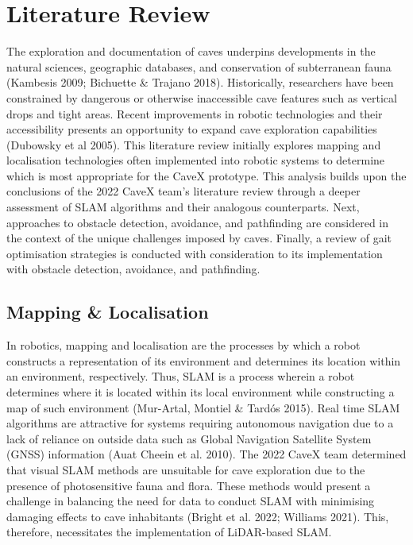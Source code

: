 \section{Literature Review} 
\label{sec:litreview}
The exploration and documentation of caves underpins developments in the natural sciences, geographic databases, and conservation of subterranean fauna (Kambesis 2009; Bichuette \& Trajano 2018). Historically, researchers have been constrained by dangerous or otherwise inaccessible cave features such as vertical drops and tight areas. Recent improvements in robotic technologies and their accessibility presents an opportunity to expand cave exploration capabilities (Dubowsky et al 2005). This literature review initially explores mapping and localisation technologies often implemented into robotic systems to determine which is most appropriate for the CaveX prototype. This analysis builds upon the conclusions of the 2022 CaveX team's literature review through a deeper assessment of SLAM algorithms and their analogous counterparts. Next, approaches to obstacle detection, avoidance, and pathfinding are considered in the context of the unique challenges imposed by caves. Finally, a review of gait optimisation strategies is conducted with consideration to its implementation with obstacle detection, avoidance, and pathfinding.

\subsection{Mapping \& Localisation}

In robotics, mapping and localisation are the processes by which a robot constructs a representation of its environment and determines its location within an environment, respectively. Thus, SLAM is a process wherein a robot determines where it is located within its local environment while constructing a map of such environment (Mur-Artal, Montiel \& Tardós 2015). Real time SLAM algorithms are attractive for systems requiring autonomous navigation due to a lack of reliance on outside data such as Global Navigation Satellite System (GNSS) information (Auat Cheein et al. 2010). The 2022 CaveX team determined that visual SLAM methods are unsuitable for cave exploration due to the presence of photosensitive fauna and flora. These methods would present a challenge in balancing the need for data to conduct SLAM with minimising damaging effects to cave inhabitants (Bright et al. 2022; Williams 2021). This, therefore, necessitates the implementation of LiDAR-based SLAM. 


